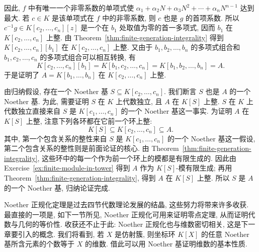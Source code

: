 \begin{Proof}
因此, $f$ 中有唯一一个非零系数的单项式使 $\alpha_{1}+\alpha_{2}N+\alpha_{3}N^{2}+\cdots+\alpha_{n}N^{n-1}$ 达到最大. 若 $c\in K$ 是该单项式在 $f$ 中的非零系数, 则 $c$ 也是 $g$ 的首项系数. 所以 $c^{-1}g\in K[c_{2},\ldots,c_{n}][z]$ 是一个在 $b_{1}$ 处取值为零的首一多项式, 因而 $b_{1}$ 在 $K[c_{2},\ldots,c_{n}]$ 上整. 由 Theorem~\ref{thm:finite-generation-integrality} 得到 $K[c_{2},\ldots,c_{n}][b_{1}]$ 在 $K[c_{2},\ldots,c_{n}]$ 上整. 又由于 $b_{1},b_{2},\ldots,b_{n}$ 的多项式组合和 $b_{1},c_{2},\ldots,c_{n}$ 的多项式组合可以相互转换, 有
\[
  K[c_{2},\ldots,c_{n}][b_{1}]=K[b_{1},c_{2},\ldots,c_{n}]
    =K[b_{1},b_{2},\ldots,b_{n}]=A.
\]
于是证明了 $A=K[b_{1},\ldots,b_{n}]$ 在 $K[c_{2},\ldots,c_{n}]$ 上整.

由归纳假设, 存在一个 Noether 基 $S\subseteq K[c_{2},\ldots,c_{n}]$. 我们断言 $S$ 也是 $A$ 的一个 Noether 基. 为此, 需要证明 $S$ 在 $K$ 上代数独立, 且 $A$ 在 $K[S]$ 上整. $S$ 在 $K$ 上代数独立直接来自 $S$ 是 $K[c_{1},\ldots,c_{n}]$ 的一个 Noether 基这一事实. 为证明 $A$ 在 $K[S]$ 上整, 注意下列各环都在它前一个环上整:
\[
  K[S]\subseteq K[c_{2},\ldots,c_{n}]\subseteq A.
\]
其中, 第一个包含关系的整性来自 $S$ 是 $K[c_{1},\ldots,c_{n}]$ 的一个 Noether 基这一假设, 第二个包含关系的整性则是前面论证的核心. 由 Theorem~\ref{thm:finite-generation-integrality}, 这些环中的每一个作为前一个环上的模都是有限生成的. 因此由 Exercise~\ref{ex:finite-module-in-tower} 得到 $A$ 作为 $K[S]$-模有限生成; 再用 Theorem~\ref{thm:finite-generation-integrality}, 得到 $A$ 在 $K[S]$ 上整. 所以 $S$ 是 $A$ 的一个 Noether 基, 归纳论证完成.
\end{Proof}

Noether 正规化定理是过去四节代数理论发展的结晶, 这些努力将带来许多收获. 最直接的一项是, 如下一节所见, Noether 正规化可用来证明零点定理, 从而证明代数与几何的等价性. 收获还不止于此: Noether 正规化也与维数密切相关, 这是下一章要引入的概念. 我们将看到, 若 $X$ 是仿射簇, 则坐标环 $K[X]$ 的任意 Noether 基所含元素的个数等于 $X$ 的维数. 借此可以用 Noether 基证明维数的基本性质.

